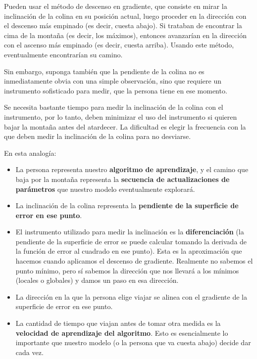 \documentclass[a4paper,12pt]{article}
\begin{document}
Pueden usar el método de descenso en gradiente, que consiste en mirar la inclinación de la colina en su posición actual, luego proceder en la dirección con el descenso más empinado (es decir, cuesta abajo).
Si trataban de encontrar la cima de la montaña (es decir, los máximos), entonces avanzarían en la dirección con el ascenso más empinado (es decir, cuesta arriba). Usando este método, eventualmente encontrarían su camino.

Sin embargo, suponga también que la pendiente de la colina no es inmediatamente obvia con una simple observación, sino que requiere un instrumento sofisticado para medir, que la persona tiene en ese momento.

Se necesita bastante tiempo para medir la inclinación de la colina con el instrumento, por lo tanto, deben minimizar el uso del instrumento si quieren bajar la montaña antes del atardecer.
La dificultad es elegir la frecuencia con la que deben medir la inclinación de la colina para no desviarse.

En esta analogía:
\begin{itemize}

\item La persona representa nuestro \textbf{algoritmo de aprendizaje}, y
el camino que baja por la montaña representa la \textbf{secuencia de actualizaciones de parámetros} que nuestro modelo eventualmente explorará.
\item La inclinación de la colina representa la \textbf{pendiente de la superficie de error en ese punto}.
\item El instrumento utilizado para medir la inclinación es la \textbf{diferenciación} (la pendiente de la superficie de error se puede calcular tomando la derivada de la función de error al cuadrado en ese punto). Esta es la aproximación que hacemos cuando aplicamos el descenso de gradiente. Realmente no sabemos el punto mínimo, pero sí sabemos la dirección que nos llevará a los mínimos (locales o globales) y damos un paso en esa dirección.
\item La dirección en la que la persona elige viajar se alinea con el gradiente de la superficie de error en ese punto.
\item La cantidad de tiempo que viajan antes de tomar otra medida es la \textbf{velocidad de aprendizaje del algoritmo}. Esto es esencialmente lo importante que nuestro modelo (o la persona que va cuesta abajo) decide dar cada vez.

\end{itemize}
\end{document}
